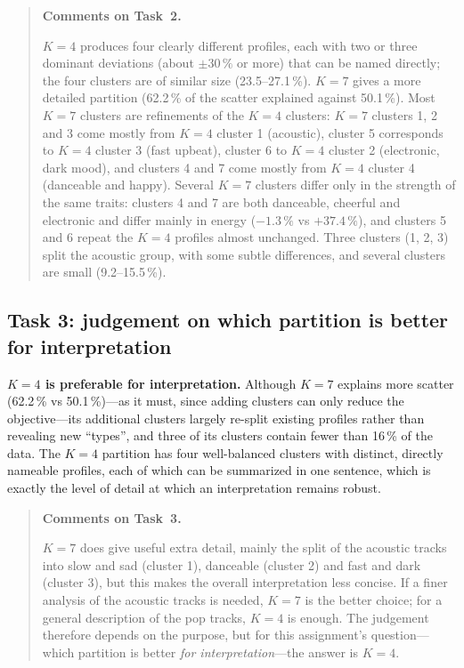 \documentclass[11pt,letterpaper]{article}
\newenvironment{taskcomments}[1][Comments]{%
  \par\medskip\noindent
  \begin{quote}\small\textbf{#1.}\enspace\ignorespaces
}{%
  \end{quote}\medskip
}
\begin{document}
\begin{taskcomments}[Comments on Task~2]
\textbf{$K=4$} produces four clearly different profiles, each with two or
three dominant deviations (about $\pm30\,\%$ or more) that can be named
directly; the four clusters are of similar size (23.5--27.1\,\%).
\textbf{$K=7$} gives a more detailed partition (62.2\,\% of the scatter
explained against 50.1\,\%). Most $K=7$ clusters are refinements of the
$K=4$ clusters: $K=7$ clusters 1, 2 and 3 come mostly from $K=4$ cluster 1
(acoustic), cluster 5 corresponds to $K=4$ cluster 3 (fast upbeat), cluster 6
to $K=4$ cluster 2 (electronic, dark mood), and clusters 4 and 7 come mostly
from $K=4$ cluster 4 (danceable and happy). Several $K=7$ clusters differ
only in the strength of the same traits: clusters 4 and 7 are both danceable,
cheerful and electronic and differ mainly in energy ($-1.3\,\%$ vs
$+37.4\,\%$), and clusters 5 and 6 repeat the $K=4$ profiles almost
unchanged. Three clusters (1, 2, 3) split the acoustic group, with some
subtle differences, and several clusters are small (9.2--15.5\,\%).
\end{taskcomments}

\subsection{Task 3: judgement on which partition is better for interpretation}\label{sec:a3t3}

\textbf{$K=4$ is preferable for interpretation.} Although $K=7$ explains more
scatter (62.2\,\% vs 50.1\,\%)---as it must, since adding clusters can only
reduce the objective---its additional clusters largely re-split existing
profiles rather than revealing new ``types'', and three of its clusters
contain fewer than 16\,\% of the data. The $K=4$ partition has four
well-balanced clusters with distinct, directly nameable profiles, each of
which can be summarized in one sentence, which is exactly the level of detail
at which an interpretation remains robust.

\begin{taskcomments}[Comments on Task~3]
$K=7$ does give useful extra detail, mainly the split of the acoustic tracks
into slow and sad (cluster 1), danceable (cluster 2) and fast and dark
(cluster 3), but this makes the overall interpretation less concise. If a
finer analysis of the acoustic tracks is needed, $K=7$ is the better choice;
for a general description of the pop tracks, $K=4$ is enough. The judgement
therefore depends on the purpose, but for this assignment's question---which
partition is better \emph{for interpretation}---the answer is $K=4$.
\end{taskcomments}
\end{document}
